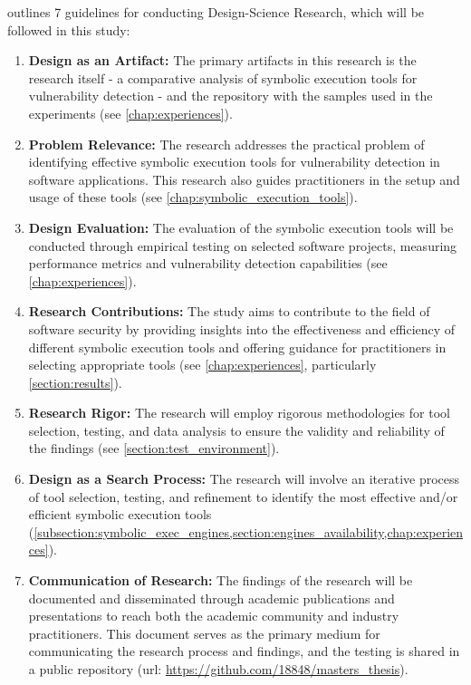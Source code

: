 \citet{Hevner2004} outlines 7 guidelines for conducting Design-Science Research, which will be followed in this study:
\begin{enumerate}
    \item \textbf{Design as an Artifact:} The primary artifacts in this research is the research itself - a comparative analysis of symbolic execution tools for vulnerability detection - and the repository with the samples used in the experiments (see \cref{chap:experiences}). 
    \item \textbf{Problem Relevance:} The research addresses the practical problem of identifying effective symbolic execution tools for vulnerability detection in software applications. This research also guides practitioners in the setup and usage of these tools (see \cref{chap:symbolic_execution_tools}).
    \item \textbf{Design Evaluation:} The evaluation of the symbolic execution tools will be conducted through empirical testing on selected software projects, measuring performance metrics and vulnerability detection capabilities (see \cref{chap:experiences}).
    \item \textbf{Research Contributions:} The study aims to contribute to the field of software security by providing insights into the effectiveness and efficiency of different symbolic execution tools and offering guidance for practitioners in selecting appropriate tools (see \cref{chap:experiences}, particularly \cref{section:results}).
    \item \textbf{Research Rigor:} The research will employ rigorous methodologies for tool selection, testing, and data analysis to ensure the validity and reliability of the findings (see \cref{section:test_environment}).
    \item \textbf{Design as a Search Process:} The research will involve an iterative process of tool selection, testing, and refinement to identify the most effective and/or efficient symbolic execution tools (\cref{subsection:symbolic_exec_engines,section:engines_availability,chap:experiences}).
    \item \textbf{Communication of Research:} The findings of the research will be documented and disseminated through academic publications and presentations to reach both the academic community and industry practitioners. This document serves as the primary medium for communicating the research process and findings, and the testing is shared in a public repository (url: \url{https://github.com/18848/masters_thesis}).
\end{enumerate}

